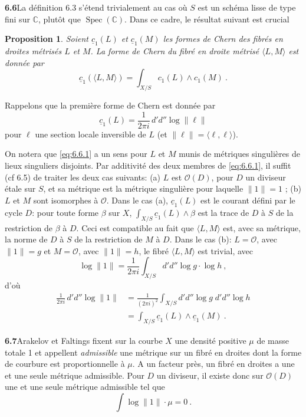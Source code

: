 \documentclass[12pt,a4paper]{article}
\theoremstyle{plain}
\newtheorem{proposition}[theorem]{Proposition}
\theoremstyle{definition}
\theoremstyle{remark}
\DeclareMathOperator{\Spec}{Spec}
\newcommand{\bbC}{\mathbb{C}}
\newcommand{\calO}{\mathcal{O}}
\begin{document}
\medskip
\noindent\textbf{6.6}\quad La d\'efinition 6.3 s'\'etend trivialement au cas o\`u $S$ est un sch\'ema lisse de type fini sur $\bbC$, plut\^ot que $\Spec(\bbC)$. Dans ce cadre, le r\'esultat suivant est crucial

\begin{proposition}
Soient $\underline{c}_1(L)$ et $\underline{c}_1(M)$ les formes de Chern des fibr\'es en droites m\'etris\'es $L$ et $M$. La forme de Chern du fibr\'e en droite m\'etris\'e $\langle L, M \rangle$ est donn\'ee par
\begin{equation}
\label{eq:6.6.1}
\underline{c}_1(\langle L, M \rangle) = \int_{X/S} c_1(L) \wedge c_1(M) \ .
\end{equation}
\end{proposition}

Rappelons que la premi\`ere forme de Chern est donn\'ee par
\[
\underline{c}_1(L) = \frac{1}{2\pi i} \, d'd'' \log \|\ell\|
\]
pour $\ell$ une section locale inversible de $L$ (et $\|\ell\| = \langle \ell, \ell \rangle$).

On notera que \eqref{eq:6.6.1} a un sens pour $L$ et $M$ munis de m\'etriques singuli\`eres de lieux singuliers disjoints. Par additivit\'e des deux membres de \eqref{eq:6.6.1}, il suffit (cf 6.5) de traiter les deux cas suivants: (a) $L$ est $\calO(D)$, pour $D$ un diviseur \'etale sur $S$, et sa m\'etrique est la m\'etrique singuli\`ere pour laquelle $\|1\| = 1$ ; (b) $L$ et $M$ sont isomorphes \`a $\calO$. Dans le cas (a), $\underline{c}_1(L)$ est le courant d\'efini par le cycle $D$: pour toute forme $\beta$ sur $X$, $\int_{X/S} \underline{c}_1(L) \wedge \beta$ est la trace de $D$ \`a $S$ de la restriction de $\beta$ \`a $D$. Ceci est compatible au fait que $\langle L, M \rangle$ est, avec sa m\'etrique, la norme de $D$ \`a $S$ de la restriction de $M$ \`a $D$. Dans le cas (b): $L = \calO$, avec $\|1\| = g$ et $M = \calO$, avec $\|1\| = h$, le fibr\'e $\langle L, M \rangle$ est trivial, avec
\[
\log \|1\| = \frac{1}{2\pi i} \int_{X/S} d'd'' \log g \cdot \log h \ ,
\]
d'o\`u
\begin{align*}
\frac{1}{2\pi i} \, d'd'' \log \|1\| &= \frac{1}{(2\pi i)^2} \int_{X/S} d'd'' \log g \; d'd'' \log h \\
&= \int_{X/S} \underline{c}_1(L) \wedge \underline{c}_1(M) \ .
\end{align*}

\medskip
\noindent\textbf{6.7}\quad Arakelov et Faltings fixent sur la courbe $X$ une densit\'e positive $\mu$ de masse totale 1 et appellent \emph{admissible} une m\'etrique sur un fibr\'e en droites dont la forme de courbure est proportionnelle \`a $\mu$. A un facteur pr\`es, un fibr\'e en droites a une et une seule m\'etrique admissible. Pour $D$ un diviseur, il existe donc sur $\calO(D)$ une et une seule m\'etrique admissible tel que
\[
\int \log \|1\| \cdot \mu = 0 \ .
\]
\end{document}
